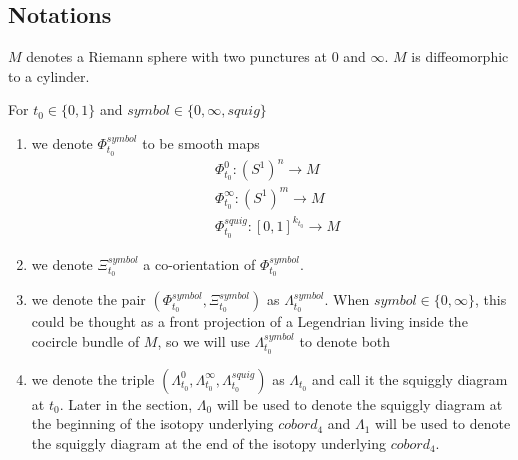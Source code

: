 \subsection{Notations}
\begin{definition}
$M$ denotes a Riemann sphere with two punctures at $0$ and $\infty$. $M$ is diffeomorphic to a cylinder.
\end{definition}
\begin{definition}
For $t_0\in\{0,1\}$ and $symbol\in\{0,\infty, squig \}$
\begin{enumerate}
\item we denote $\Phi_{t_0}^{symbol}$ to be smooth maps
\begin{align*}
&\Phi_{t_0}^0 : (S^1)^n \rightarrow M \\
&\Phi_{t_0}^\infty : (S^1)^m \rightarrow M \\
&\Phi_{t_0}^{squig} : [0,1]^{k_{t_0}} \rightarrow M
\end{align*}

\item we denote $\Xi_{t_0}^{symbol}$ a co-orientation of $\Phi_{t_0}^{symbol}$.

\item we denote the pair $(\Phi_{t_0}^{symbol},\Xi_{t_0}^{symbol})$ as $\Lambda_{t_0}^{symbol}$. When $symbol \in \{0,\infty\}$, this could be thought as a front projection of a Legendrian living inside the cocircle bundle of $M$, so we will use $\Lambda_{t_0}^{symbol}$ to denote both

\item we denote the triple $(\Lambda_{t_0}^{0},\Lambda_{t_0}^{\infty},\Lambda_{t_0}^{squig})$ as $\Lambda_{t_0}$ and call it the squiggly diagram at $t_0$. Later in the section, $\Lambda_0$ will be used to denote the squiggly diagram at the beginning of the isotopy underlying $cobord_4$ and $\Lambda_1$ will be used to denote the squiggly diagram at the end of the isotopy underlying $cobord_4$. 
\end{enumerate}
\end{definition}

